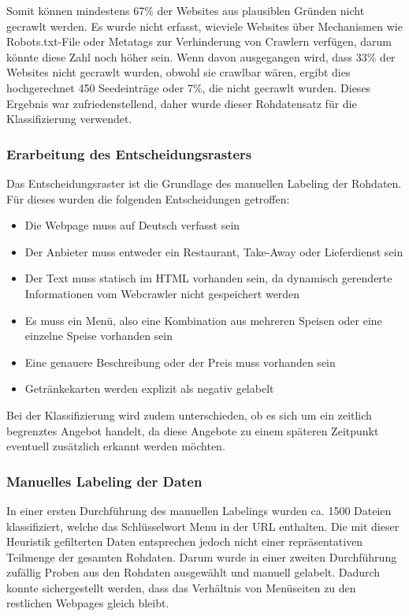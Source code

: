 Somit können mindestens 67\% der Websites aus plausiblen Gründen nicht gecrawlt werden.
Es wurde nicht erfasst, wieviele Websites über Mechanismen wie Robots.txt-File oder Metatags zur Verhinderung von Crawlern verfügen, darum könnte diese Zahl noch höher sein.
Wenn davon ausgegangen wird, dass 33\% der Websites nicht gecrawlt wurden, obwohl sie crawlbar wären, ergibt dies hochgerechnet 450 Seedeinträge oder 7\%, die nicht gecrawlt wurden.
Dieses Ergebnis war zufriedenstellend, daher wurde dieser Rohdatensatz für die Klassifizierung verwendet.
\subsubsection{Erarbeitung des Entscheidungsrasters}
Das Entscheidungsraster ist die Grundlage des manuellen Labeling der Rohdaten.
Für dieses wurden die folgenden Entscheidungen getroffen:
\begin{itemize}
	\item Die Webpage muss auf Deutsch verfasst sein
	\item Der Anbieter muss entweder ein Restaurant, Take-Away oder Lieferdienst sein
	\item Der Text muss statisch im HTML vorhanden sein, da dynamisch gerenderte Informationen vom Webcrawler nicht gespeichert werden
	\item Es muss ein Menü, also eine Kombination aus mehreren Speisen oder eine einzelne Speise vorhanden sein
	\item Eine genauere Beschreibung oder der Preis muss vorhanden sein
	\item Getränkekarten werden explizit als negativ gelabelt
\end{itemize}
Bei der Klassifizierung wird zudem unterschieden, ob es sich um ein zeitlich begrenztes Angebot handelt, da diese Angebote zu einem späteren Zeitpunkt eventuell zusätzlich erkannt werden möchten.
\subsubsection{Manuelles Labeling der Daten}
In einer ersten Durchführung des manuellen Labelings wurden ca. 1500 Dateien klassifiziert, welche das Schlüsselwort \glqq Menu\grqq{} in der URL enthalten.
Die mit dieser Heuristik gefilterten Daten entsprechen jedoch nicht einer repräsentativen Teilmenge der gesamten Rohdaten.
Darum wurde in einer zweiten Durchführung zufällig Proben aus den Rohdaten ausgewählt und manuell gelabelt.
Dadurch konnte sichergestellt werden, dass das Verhältnis von Menüseiten zu den restlichen Webpages gleich bleibt.

